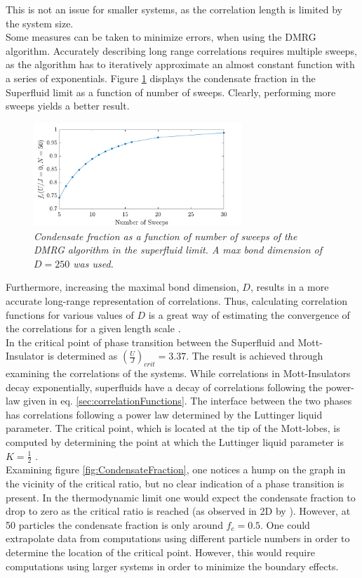 This is not an issue for smaller systems, as the correlation length is limited by the system size. \\
Some measures can be taken to minimize errors, when using the DMRG algorithm. Accurately describing long range correlations requires multiple sweeps, as the algorithm has to iteratively approximate an almost constant function with a series of exponentials. Figure \ref{fig:sweepdependence} displays the condensate fraction in the Superfluid limit as a function of number of sweeps. Clearly, performing more sweeps yields a better result.
\begin{figure}[h!]
    \centering
    \includegraphics[width=0.7\textwidth]{Figures/CFsweeps.pdf}
    \caption{\textit{Condensate fraction as a function of number of sweeps of the DMRG algorithm in the superfluid limit. A max bond dimension of $D = 250$ was used.}}
    \label{fig:sweepdependence}
\end{figure}
Furthermore, increasing the maximal bond dimension, $D$, results in a more accurate long-range representation of correlations. Thus, calculating correlation functions for various values of $D$ is a great way of estimating the convergence of the correlations for a given length scale \cite{schollwock}.\\

In \cite{Kuhner2000} the critical point of phase transition between the Superfluid and Mott-Insulator is determined as $\left( \frac{U}{J} \right)_{crit} = 3.37$. The result is achieved through examining the correlations of the systems. While correlations in Mott-Insulators decay exponentially, superfluids have a decay of correlations following the power-law given in eq. \eqref{sec:correlationFunctions}. The interface between the two phases has correlations following a power law determined by the Luttinger liquid parameter. The critical point, which is located at the tip of the Mott-lobes, is computed by determining the point at which the Luttinger liquid parameter is $K =  \frac{1}{2}$ \cite{Kuhner2000}.\\
Examining figure \ref{fig:CondensateFraction}, one notices a hump on the graph in the vicinity of the critical ratio, but no clear indication of a phase transition is present. In the thermodynamic limit one would expect the condensate fraction to drop to zero as the critical ratio is reached (as observed in 2D by \cite{Spielman2008}). However, at 50 particles the condensate fraction is only around $ f_c = 0.5$. One could extrapolate data from computations using different particle numbers in order to determine the location of the critical point. However, this would require computations using larger systems in order to minimize the boundary effects.